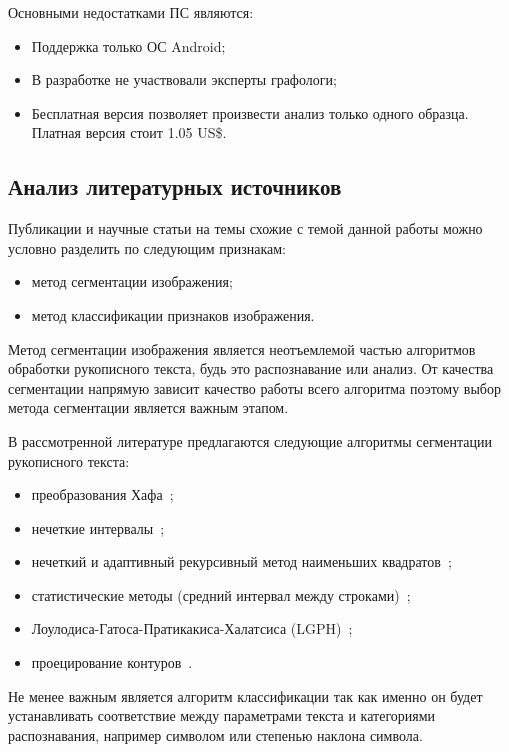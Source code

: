 Основными недостатками ПС являются:
\begin{itemize}
  \item Поддержка только ОС Android;
  \item В разработке не участвовали эксперты графологи;
  \item Бесплатная версия позволяет произвести анализ только одного образца. Платная версия стоит 1.05 US\$.
\end{itemize}

\subsection{Анализ литературных источников}
\label{sub:domain:literary_sources}

Публикации и научные статьи на темы схожие с темой данной работы можно условно разделить по следующим признакам:
\begin{itemize}
  \item метод сегментации изображения;
  \item метод классификации признаков изображения.
\end{itemize}

Метод сегментации изображения является неотъемлемой частью алгоритмов обработки рукописного текста, будь это распознавание или анализ. От качества сегментации напрямую зависит качество работы всего алгоритма поэтому выбор метода сегментации является важным этапом.

В рассмотренной литературе предлагаются следующие алгоритмы сегментации рукописного текста:
\begin{itemize}
  \item преобразования Хафа~\cite{louloudis_gatos_pratikakis_halatsis};
  \item нечеткие интервалы~\cite{louloudis_gatos_pratikakis_halatsis};
  \item нечеткий и адаптивный рекурсивный метод наименьших квадратов~\cite{louloudis_gatos_pratikakis_halatsis};
  \item статистические методы (средний интервал между строками)~\cite{gomathi_umadevi_mohanavel};
  \item Лоулодиса-Гатоса-Пратикакиса-Халатсиса (LGPH)~\cite{louloudis_gatos_pratikakis_halatsis};
  \item проецирование контуров~\cite{louloudis_gatos_pratikakis_halatsis}.
\end{itemize}

Не менее важным является алгоритм классификации так как именно он будет устанавливать соответствие между параметрами текста и категориями распознавания, например символом или степенью наклона символа.

